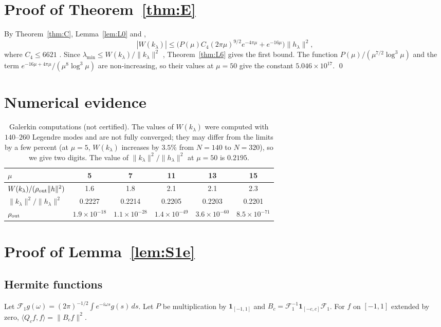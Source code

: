 \documentclass[11pt]{amsart}
\theoremstyle{remark}
\numberwithin{equation}{section}
\begin{document}
\section{Proof of Theorem~\ref{thm:E}}\label{sec:E}
By Theorem~\ref{thm:C}, Lemma~\ref{lem:L0} and \cite[Thm.~1]{MoriPSWF},
\[
|W(k_\lambda)|\le\big(P(\mu)C_4(2\pi\mu)^{9/2}e^{-4\pi\mu}+e^{-16\mu}\big)\|h_\lambda\|^2,
\]
where $C_4\le6621$ \cite[Thm.~1 and Table~1]{MoriPSWF}. Since $\lambda_{\min}\le W(k_\lambda)/\|k_\lambda\|^2$ \cite[(2.1)]{MoriWWUB}, Theorem~\ref{thm:L6} gives the first bound. The function $P(\mu)/(\mu^{7/2}\log^3\mu)$ and the term $e^{-16\mu+4\pi\mu}/(\mu^8\log^3\mu)$ are non-increasing, so their values at $\mu=50$ give the constant $5.046\times10^{17}$. \qed

\section{Numerical evidence}\label{sec:num}

\begin{table}[h]
\centering
\begin{tabular}{lccccc}
\toprule
$\mu$ & 5 & 7 & 11 & 13 & 15\\
\midrule
$W(k_\lambda)/(\rho_{\rm out}\|h\|^2)$ & 1.6 & 1.8 & 2.1 & 2.1 & 2.3\\
$\|k_\lambda\|^2/\|h_\lambda\|^2$ & 0.2227 & 0.2214 & 0.2205 & 0.2203 & 0.2201\\
$\rho_{\rm out}$ & $1.9\times10^{-18}$ & $1.1\times10^{-28}$ & $1.4\times10^{-49}$ & $3.6\times10^{-60}$ & $8.5\times10^{-71}$\\
\bottomrule
\end{tabular}
\caption{Galerkin computations (not certified). The values of $W(k_\lambda)$ were computed with $140$--$260$ Legendre modes and are not fully converged; they may differ from the limits by a few percent (at $\mu=5$, $W(k_\lambda)$ increases by $3.5\%$ from $N=140$ to $N=320$), so we give two digits. The value of $\|k_\lambda\|^2/\|h_\lambda\|^2$ at $\mu=50$ is $0.2195$.}
\end{table}


\appendix

\section{Proof of Lemma~\ref{lem:S1e}}\label{app:S1e}

\subsection*{Hermite functions}
Let $\mathcal F_1g(\omega)=(2\pi)^{-1/2}\int e^{-i\omega s}g(s)\,ds$. Let $P$ be multiplication by $\mathbf 1_{[-1,1]}$ and $B_c=\mathcal F_1^{-1}\mathbf 1_{[-c,c]}\mathcal F_1$. For $f$ on $[-1,1]$ extended by zero, $\langle Q_cf,f\rangle=\|B_cf\|^2$.
\end{document}
